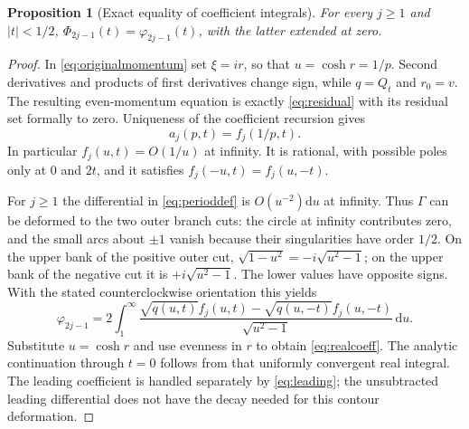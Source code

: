 \documentclass[10pt]{article}
\newtheorem{proposition}[theorem]{Proposition}
\newcommand{\dd}{\mathrm d}
\newcommand{\ph}{\varphi}
\begin{document}
\begin{proposition}[Exact equality of coefficient integrals]\label{prop:periods}
For every $j\ge1$ and $|t|<1/2$,
$\Phi_{2j-1}(t)=\ph_{2j-1}(t)$, with the latter extended at zero.
\end{proposition}
\begin{proof}
In \eqref{eq:originalmomentum} set $\xi=ir$, so that
$u=\cosh r=1/p$. Second derivatives and products of first
derivatives change sign, while $q=Q_t$ and $r_0=v$.
The resulting even-momentum equation is exactly
\eqref{eq:residual} with its residual set formally to zero.
Uniqueness of the coefficient recursion gives
\begin{equation}
a_j(p,t)=f_j(1/p,t).
\label{eq:inversion}
\end{equation}
In particular $f_j(u,t)=O(1/u)$ at infinity. It is rational,
with possible poles only at $0$ and $2t$, and it satisfies
$f_j(-u,t)=f_j(u,-t)$.

For $j\ge1$ the differential in \eqref{eq:perioddef} is
$O(u^{-2})\dd u$ at infinity. Thus $\Gamma$ can be deformed
to the two outer branch cuts: the circle at infinity contributes
zero, and the small arcs about $\pm1$ vanish because their
singularities have order $1/2$. On the upper bank of the positive
outer cut, $\sqrt{1-u^2}=-i\sqrt{u^2-1}$; on the upper bank of the
negative cut it is $+i\sqrt{u^2-1}$. The lower values have opposite
signs. With the stated counterclockwise orientation this yields
\begin{equation}
\ph_{2j-1}=2\int_1^\infty
 \frac{\sqrt{q(u,t)}f_j(u,t)-\sqrt{q(u,-t)}f_j(u,-t)}
 {\sqrt{u^2-1}}\,\dd u.
\label{eq:outercuts}
\end{equation}
Substitute $u=\cosh r$ and use evenness in $r$ to obtain
\eqref{eq:realcoeff}. The analytic continuation through $t=0$
follows from that uniformly convergent real integral.
The leading coefficient is handled separately by
\eqref{eq:leading}; the unsubtracted leading differential
does not have the decay needed for this contour deformation.
\end{proof}
\end{document}
